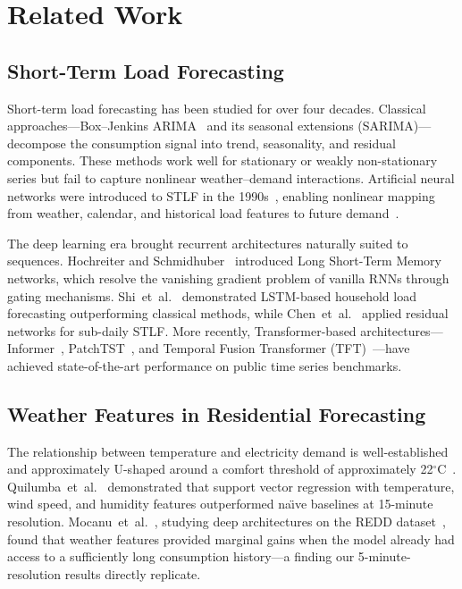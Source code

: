 \documentclass[12pt,a4paper]{article}
\begin{document}
\section{Related Work}
\label{sec:related}

\subsection{Short-Term Load Forecasting}

Short-term load forecasting has been studied for over four decades. Classical
approaches---Box--Jenkins ARIMA~\cite{box2015} and its seasonal extensions
(SARIMA)---decompose the consumption signal into trend, seasonality, and
residual components. These methods work well for stationary or weakly
non-stationary series but fail to capture nonlinear weather--demand
interactions. Artificial neural networks were introduced to STLF in the
1990s~\cite{bunn1985}, enabling nonlinear mapping from weather, calendar, and
historical load features to future demand~\cite{papalexopoulos1990}.

The deep learning era brought recurrent architectures naturally suited to
sequences. Hochreiter and Schmidhuber~\cite{hochreiter1997} introduced Long
Short-Term Memory networks, which resolve the vanishing gradient problem of
vanilla RNNs through gating mechanisms. Shi~et~al.~\cite{shi2018} demonstrated
LSTM-based household load forecasting outperforming classical methods, while
Chen~et~al.~\cite{chen2019} applied residual networks for sub-daily STLF.
More recently, Transformer-based architectures---Informer~\cite{zhou2021},
PatchTST~\cite{nie2023}, and Temporal Fusion Transformer
(TFT)~\cite{lim2021}---have achieved state-of-the-art performance on public
time series benchmarks.

\subsection{Weather Features in Residential Forecasting}

The relationship between temperature and electricity demand is well-established
and approximately U-shaped around a comfort threshold of approximately
22$^\circ$C~\cite{mirasgedis2006}. Quilumba~et~al.~\cite{quilumba2015}
demonstrated that support vector regression with temperature, wind speed, and
humidity features outperformed na\"{\i}ve baselines at 15-minute resolution.
Mocanu~et~al.~\cite{mocanu2016}, studying deep architectures on the REDD
dataset~\cite{kolter2011}, found that weather features provided marginal gains
when the model already had access to a sufficiently long consumption
history---a finding our 5-minute-resolution results directly replicate.
\end{document}

